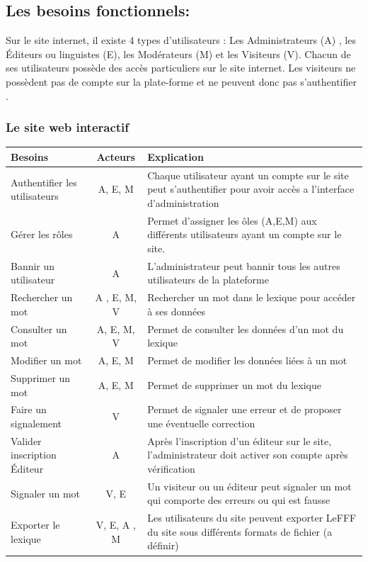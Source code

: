 \documentclass[12pt,a4paper]{article}
\begin{document}
\subsection{Les besoins fonctionnels:}

Sur le site internet, il existe 4 types d’utilisateurs : Les Administrateurs (A) , les Éditeurs ou linguistes (E), les Modérateurs (M) et les Visiteurs (V).
Chacun de ses utilisateurs possède des accès particuliers sur le site internet.
Les visiteurs ne possèdent pas de compte sur la plate-forme et ne peuvent donc pas s'authentifier . 

\subsubsection{Le site web interactif}
\begin{tabularx}{\textwidth}{|l|c|X|}
  \hline
  \textbf{Besoins} & 
  \textbf{Acteurs} & 
  \textbf{Explication} \\
  \hline
  Authentifier les utilisateurs & 
  A, E, M & 
  Chaque utilisateur ayant un compte sur le site peut s'authentifier pour avoir accès a l'interface d'administration \\ 
  \hline
  Gérer les rôles & A
   & Permet d'assigner les ôles (A,E,M) aux différents utilisateurs ayant un compte sur le site.
 \\
  \hline
  Bannir un utilisateur& 
  A & 
  L'administrateur peut bannir tous les autres utilisateurs de la plateforme \\
  \hline
  Rechercher un mot & 
  A , E, M, V & 
  Rechercher un mot dans le lexique pour accéder à ses données \\
  \hline
  Consulter un mot &
  A, E, M, V &
  Permet de consulter les données d'un mot du lexique \\
  \hline
  Modifier un mot &
  A, E, M & 
  Permet de modifier les données liées à un mot \\
  \hline
  Supprimer un mot &
  A, E, M & 
  Permet de supprimer un mot du lexique \\
  \hline
  Faire un signalement & 
  V &
  Permet de signaler une erreur et de proposer une éventuelle correction \\
  \hline
  Valider inscription Éditeur &
  A &
  Après l'inscription d'un éditeur sur le site, l'administrateur doit activer son compte après vérification \\
  \hline
  Signaler un mot &
  V, E &
  Un visiteur ou un éditeur peut signaler un mot qui comporte des erreurs ou qui est fausse \\
  \hline
  Exporter le lexique &
  V, E, A , M &
  Les utilisateurs du site peuvent exporter LeFFF du site sous différents formats de fichier (a définir)\\
  \hline
\end{tabularx}
\end{document}
